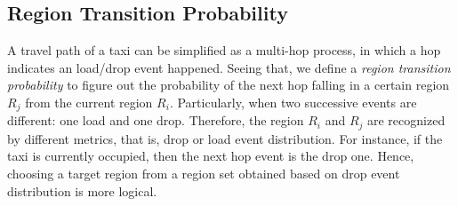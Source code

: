 \subsection{Region Transition Probability}

A travel path of a taxi can be simplified as a multi-hop process, in which a hop indicates an load/drop event happened. Seeing that, we define a \emph{ region transition probability} to figure out the probability of the next hop falling in a certain region $R_j$ from the current region $R_i$. Particularly, when two successive events are different: one load and one drop. Therefore, the region $R_i$ and $R_j$ are recognized by different metrics, that is, drop or load event distribution. For instance, if the taxi is currently occupied, then the next hop event is the drop one. Hence, choosing a target region from a region set obtained based on drop event distribution is more logical.

